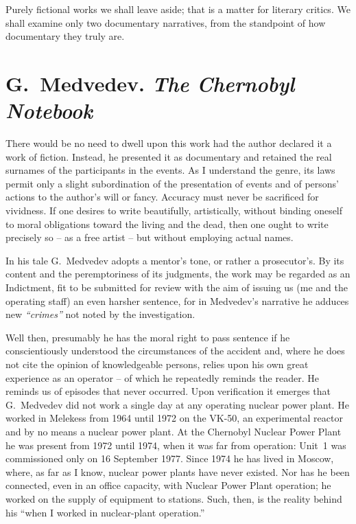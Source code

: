 \documentclass[openright]{bookest}
\begin{document}
Purely fictional works we shall leave aside; that is a matter for literary critics. We shall examine only two documentary narratives, from the standpoint of how documentary they truly are.

\section{G.~Medvedev. \textit{The Chernobyl Notebook}}

There would be no need to dwell upon this work had the author declared it a work of fiction. Instead, he presented it as documentary and retained the real surnames of the participants in the events. As I understand the genre, its laws permit only a slight subordination of the presentation of events and of persons' actions to the author's will or fancy. Accuracy must never be sacrificed for vividness. If one desires to write beautifully, artistically, without binding oneself to moral obligations toward the living and the dead, then one ought to write precisely so -- as a free artist -- but without employing actual names.

In his tale G.~Medvedev adopts a mentor's tone, or rather a prosecutor's. By its content and the peremptoriness of its judgments, the work may be regarded as an Indictment, fit to be submitted for review with the aim of issuing us (me and the operating staff) an even harsher sentence, for in Medvedev's narrative he adduces new \textit{``crimes''} not noted by the investigation.

Well then, presumably he has the moral right to pass sentence if he conscientiously understood the circumstances of the accident and, where he does not cite the opinion of knowledgeable persons, relies upon his own great experience as an operator -- of which he repeatedly reminds the reader. He reminds us of episodes that never occurred. Upon verification it emerges that G.~Medvedev did not work a single day at any operating nuclear power plant. He worked in Melekess from 1964 until 1972 on the VK-50, an experimental reactor and by no means a nuclear power plant. At the Chernobyl Nuclear Power Plant he was present from 1972 until 1974, when it was far from operation: Unit~1 was commissioned only on 16 September 1977. Since 1974 he has lived in Moscow, where, as far as I know, nuclear power plants have never existed. Nor has he been connected, even in an office capacity, with Nuclear Power Plant operation; he worked on the supply of equipment to stations. Such, then, is the reality behind his ``when I worked in nuclear-plant operation.''
\end{document}
